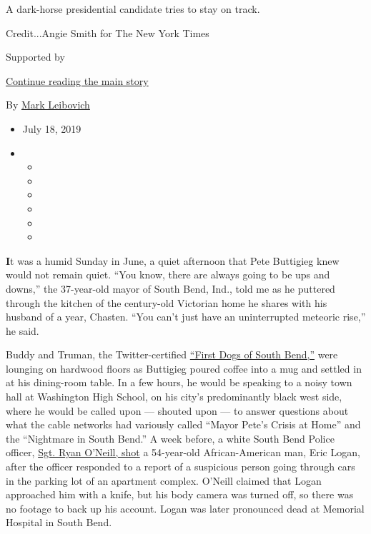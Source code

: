 A dark-horse presidential candidate tries to stay on track.

Credit...Angie Smith for The New York Times

Supported by

\protect\hyperlink{after-sponsor}{Continue reading the main story}

By \href{https://www.nytimes3xbfgragh.onion/by/mark-leibovich}{Mark
Leibovich}

\begin{itemize}
\item
  July 18, 2019
\item
  \begin{itemize}
  \item
  \item
  \item
  \item
  \item
  \item
  \end{itemize}
\end{itemize}

\textbf{I}t was a humid Sunday in June, a quiet afternoon that Pete
Buttigieg knew would not remain quiet. ``You know, there are always
going to be ups and downs,'' the 37-year-old mayor of South Bend, Ind.,
told me as he puttered through the kitchen of the century-old Victorian
home he shares with his husband of a year, Chasten. ``You can't just
have an uninterrupted meteoric rise,'' he said.

Buddy and Truman, the Twitter-certified
\href{https://twitter.com/firstdogsSB}{``First Dogs of South Bend,''}
were lounging on hardwood floors as Buttigieg poured coffee into a mug
and settled in at his dining-room table. In a few hours, he would be
speaking to a noisy town hall at Washington High School, on his city's
predominantly black west side, where he would be called upon --- shouted
upon --- to answer questions about what the cable networks had variously
called ``Mayor Pete's Crisis at Home'' and the ``Nightmare in South
Bend.'' A week before, a white South Bend Police officer,
\href{https://www.nytimes3xbfgragh.onion/2019/06/18/us/politics/buttigieg-south-bend-police-shooting.html}{Sgt.
Ryan O'Neill, shot} a 54-year-old African-American man, Eric Logan,
after the officer responded to a report of a suspicious person going
through cars in the parking lot of an apartment complex. O'Neill claimed
that Logan approached him with a knife, but his body camera was turned
off, so there was no footage to back up his account. Logan was later
pronounced dead at Memorial Hospital in South Bend.

